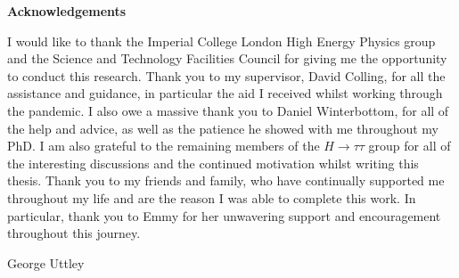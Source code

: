 \begin{titlepage}
\newpage


\vspace*{\fill}
\begin{adjustwidth}{1cm}{1cm}
\begin{center}
\Large \textbf{Acknowledgements}
\vspace{0.5cm}
\end{center}

I would like to thank the Imperial College London High Energy Physics group and the Science and Technology Facilities Council for giving me the opportunity to conduct this research.
Thank you to my supervisor, David Colling, for all the assistance and guidance, in particular the aid I received whilst working through the pandemic.
I also owe a massive thank you to Daniel Winterbottom, for all of the help and advice, as well as the patience he showed with me throughout my PhD.
I am also grateful to the remaining members of the $H\rightarrow\tau\tau$ group for all of the interesting discussions and the continued motivation whilst writing this thesis.
Thank you to my friends and family, who have continually supported me throughout my life and are the reason I was able to complete this work.
In particular, thank you to Emmy for her unwavering support and encouragement throughout this journey.

\begin{FlushRight}
George Uttley
\end{FlushRight}
\end{adjustwidth}
\vspace*{\fill}

\end{titlepage}